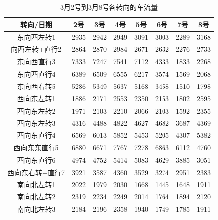 \documentclass[UTF8]{article}
\begin{document}
    \begin{table}[h]
        \centering
        \caption{3月2号到3月8号各转向的车流量}
        \begin{tabular}{cccccccc}
           \hline
            转向/日期 & 2号 & 3号 & 4号 & 5号 & 6号 & 7号 & 8号 \\
           \hline
            东向西左转1	& 2935	&2942	&2949	&3091	&3003	&2289	&3168\\
           
            向西左转+直行2	&2864 &2870	&2984	&2671	&2632	&2276	&2733\\
           
            东向西直行3	&7333	&7247	&7541	&7112	&4333	&1833	&2268\\
           
            东向西直行4	&6389	&6509	&6555	&6217	&3574	&1569	&2068\\
           
            东向西右转5	&5286	&5349	&5637	&5168	&3458	&1510	&1798\\
           
            西向东左转1	&1886	&2171	&2553	&2350	&2153	&1802	&2595\\
           
            西向东左转2	&1971	&2103	&2210	&2066	&2103	&1592	&2355\\
           
            西向东左转3	&4316	&4488	&4822	&4627	&4682	&3687	&4369\\
           
            西向东直行4	&6569	&6013	&5852	&5453	&5205	&4307	&5382\\
           
            西向东东直行5	&6880	&6671	&7767	&7278	&6863	&6112	&4760\\
           
            西向东直行6	&4974	&4752	&5414	&5083	&4629	&3885	&3051\\
           
            西向东右转+直行7	&3921	&3587	&4360	&3529	&3274	&2951	&2383\\
           
            南向北左转1	&2022	&1979	&2030	&1668	&1445	&1648	&1911\\
           
            南向北左转2	&2319	&2234	&2249	&2014	&1764	&1894	&2120\\
           
            南向北左转3	&2184	&2196	&2358	&1940	&1749	&1785	&1911\\
           

\end{tabular}
\end{table}
\end{document}
